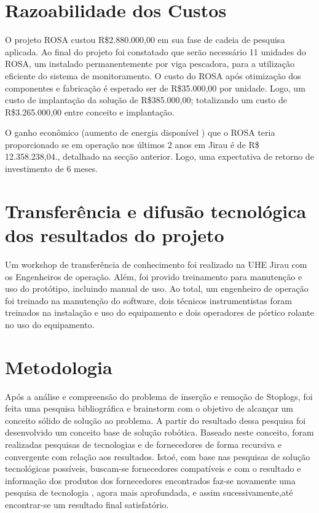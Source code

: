 \section{Razoabilidade dos Custos}
O projeto ROSA custou R\$2.880.000,00 em sua fase de cadeia de pesquisa
aplicada. Ao final do projeto foi constatado que serão necessário 11 unidades 
do ROSA, um instalado permanentemente por viga pescadora, para a utilização 
eficiente do sistema de monitoramento. O custo do ROSA após otimização dos 
componentes e fabricação é esperado ser de R\$35.000,00 por unidade. Logo, um
custo de implantação da solução de R\$385.000,00; totalizando um custo de
R\$3.265.000,00 entre conceito e implantação.

O ganho econômico (aumento de energia disponível ) que o ROSA teria proporcionado 
se em operação nos últimos 2 anos em Jirau é de R\$ 12.358.238,04., detalhado
na secção anterior. Logo, uma expectativa de retorno de investimento de 6 meses.

\section{Transferência e difusão tecnológica dos resultados do projeto}
Um workshop de transferência de conhecimento foi realizado na UHE Jirau com os
Engenheiros de operação. Além, foi provido treinamento para manutenção e uso do 
protótipo, incluindo manual de uso. Ao total, um engenheiro de operação foi 
treinado na manutenção do software, dois técnicos instrumentistas foram treinados 
na instalação e uso do equipamento e dois operadores de pórtico rolante no uso 
do equipamento.

\section{Metodologia}

Após a análise e compreensão do problema de inserção e remoção de Stoplogs, foi 
feita uma pesquisa bibliográfica e brainstorm com o objetivo de alcançar um
conceito sólido de solução ao problema. A partir do resultado dessa pesquisa foi 
desenvolvido um conceito base de solução robótica. Baseado neste conceito, foram 
realizadas pesquisas de tecnologias e de fornecedores de forma recursiva e 
convergente com relação aos resultados. Istoé, com base nas pesquisas de solução 
tecnológicas possíveis, buscam-se fornecedores compatíveis e com o resultado e 
informação dos produtos dos fornecedores encontrados faz-se novamente uma pesquisa de 
tecnologia , agora mais aprofundada, e assim sucessivamente,até encontrar-se um 
resultado final satisfatório.  

